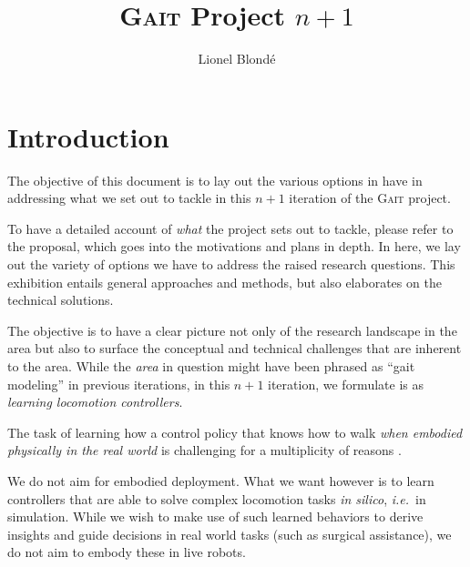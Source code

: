 \documentclass[12pt,a4paper]{article}
\title{\textsc{Gait} Project $n+1$}
\author{Lionel Blond\'e}
\begin{document}
\maketitle

\tableofcontents

\section{Introduction}
\label{s:intro}

The objective of this document
is to lay out the various options in have in addressing what we set out to tackle
in this $n+1$ iteration of the \textsc{Gait} project.

To have a detailed account of \textit{what} the project sets out to tackle, please refer to the
proposal, which goes into the motivations and plans in depth.
In here, we lay out the variety of options we have to address the raised research questions.
This exhibition entails general approaches and methods, but also elaborates on the technical
solutions.

The objective is to have a clear picture not only of the research landscape in the area
but also to surface the conceptual and technical challenges that are inherent to the area.
While the \textit{area} in question might have been phrased as ``gait modeling'' in previous
iterations, in this $n+1$ iteration, we formulate is as
\emph{learning locomotion controllers}.

The task of learning how a control policy that knows how to walk \textit{when embodied physically
in the real world} is challenging for a multiplicity of reasons
\cite{Radosavovic2024-dm, Caluwaerts2023-ko, Yang2023-jr, Kaufmann2023-yc, Smith2022-sm}.

We do not aim for embodied deployment.
What we want however is to learn controllers that are able to solve complex locomotion tasks
\textit{in silico}, \textit{i.e.}~in simulation.
While we wish to make use of such learned behaviors to derive insights and guide decisions in real
world tasks (such as surgical assistance), we do not aim to embody these in live robots.
\end{document}
